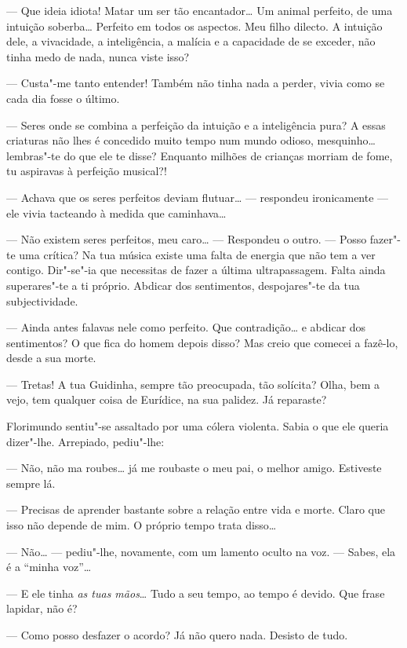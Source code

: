 --- Que ideia idiota! Matar um ser tão encantador\ldots{} Um animal perfeito,
de uma intuição soberba\ldots{} Perfeito em todos os aspectos. Meu filho
dilecto. A intuição dele, a vivacidade, a inteligência, a malícia e a
capacidade de se exceder, não tinha medo de nada, nunca viste isso?

--- Custa"-me tanto entender! Também não tinha nada a perder, vivia como se
cada dia fosse o último.

--- Seres onde se combina a perfeição da intuição e a inteligência pura? A
essas criaturas não lhes é concedido muito tempo num mundo odioso,
mesquinho\ldots{} lembras"-te do que ele te disse? Enquanto milhões de crianças
morriam de fome, tu aspiravas à perfeição musical?!

--- Achava que os seres perfeitos deviam flutuar\ldots{} --- respondeu
ironicamente ---  ele vivia tacteando à medida que caminhava\ldots{}

--- Não existem seres perfeitos, meu caro\ldots{} --- Respondeu o outro. --- Posso
fazer"-te uma crítica? Na tua música existe uma falta de energia que não
tem a ver contigo. Dir"-se"-ia que necessitas de fazer a última
ultrapassagem. Falta ainda superares"-te a ti próprio. Abdicar dos
sentimentos, despojares"-te da tua subjectividade.

--- Ainda antes falavas nele como perfeito. Que contradição\ldots{} e
abdicar dos sentimentos? O que fica do homem depois disso? Mas creio que
comecei a fazê-lo, desde a sua morte.

--- Tretas! A tua Guidinha, sempre tão preocupada, tão solícita? Olha, bem
a vejo, tem qualquer coisa de Eurídice, na sua palidez. Já reparaste?

Florimundo sentiu"-se assaltado por uma cólera violenta. Sabia o que ele
queria dizer"-lhe. Arrepiado, pediu"-lhe:

--- Não, não ma roubes\ldots{} já me roubaste o meu pai, o melhor amigo.
Estiveste sempre lá.

--- Precisas de aprender bastante sobre a relação entre vida e morte.
Claro que isso não depende de mim. O próprio tempo trata disso\ldots{}

--- Não\ldots{} --- pediu"-lhe, novamente, com um lamento oculto na voz. --- Sabes,
ela é a ``minha voz''\ldots{}

--- E ele tinha \emph{as tuas mãos}\ldots{} Tudo a seu tempo, ao tempo é devido. Que
frase lapidar, não é?

--- Como posso desfazer o acordo? Já não quero nada. Desisto de tudo.

